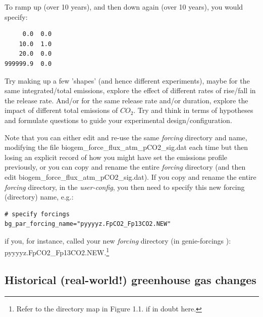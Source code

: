\vspace{1mm}
To ramp up (over 10 years), and then down again (over 10 years), you would specify:

\vspace{-2pt}\footnotesize\begin{verbatim}
     0.0  0.0
    10.0  1.0
    20.0  0.0
999999.9  0.0
\end{verbatim}\normalsize\vspace{-2pt}

Try making up a few 'shapes' (and hence different experiments), maybe for the same integrated/total emissions, explore the effect of different rates of rise/fall in the release rate. And/or for the same release rate and/or duration, explore the impact of different total emissions of \(CO_{2}\). Try and think in terms of hypotheses and formulate questions to guide your experimental design/configuration.

Note that you can either edit and re-use the same \textit{forcing} directory and name, modifying the file \textsf{\footnotesize biogem\_force\_flux\_atm\_pCO2\_sig.dat} each time but then losing an explicit record of how you might have set the emissions profile previously, or you can copy and rename the entire \textit{forcing} directory (and then edit \textsf{\footnotesize biogem\_force\_flux\_atm\_pCO2\_sig.dat}). If you copy and rename the entire \textit{forcing} directory, in the \textit{user-config}, you then need to specify this new forcing (directory) name, e.g.:
\vspace{-2pt}\small\begin{verbatim}
# specify forcings
bg_par_forcing_name="pyyyyz.FpCO2_Fp13CO2.NEW"
\end{verbatim}\normalsize\vspace{-2pt}
if you, for instance, called your new \textit{forcing} directory (in \textsf{\footnotesize genie-forcings }): \textsf{\footnotesize pyyyyz.FpCO2\_Fp13CO2.NEW}.\footnote{Refer to the directory map in Figure 1.1. if in doubt here.}

\newpage

\subsection{Historical (real-world!) greenhouse gas changes}

